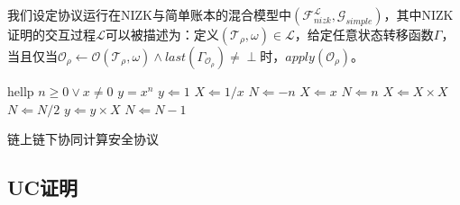 我们设定协议运行在NIZK与简单账本的混合模型中$(\mathcal{F}_{nizk}^\mathcal{L}, \mathcal{G}_{simple})$，其中NIZK证明的交互过程$\mathcal{L}$可以被描述为：定义$(\mathcal{T}_\rho, \omega) \in \mathcal{L}$，给定任意状态转移函数$\Gamma$，当且仅当$\mathcal{O}_\rho \leftarrow \mathcal{O}(\mathcal{T}_\rho, \omega)\wedge last(\Gamma_{\mathcal{O}_\rho}) \neq \perp$时，$apply(\mathcal{O}_\rho)$。

\begin{algorithm}[H]
    \begin{algorithmic} 
        \STATE hellp
        \REQUIRE $n \geq 0 \vee x \neq 0$
        \ENSURE $y = x^n$
        \STATE $y \Leftarrow 1$
            \STATE $X \Leftarrow 1 / x$
            \STATE $N \Leftarrow -n$
        \ELSE
            \STATE $X \Leftarrow x$
            \STATE $N \Leftarrow n$
        \ENDIF
                \STATE $X \Leftarrow X \times X$
                \STATE $N \Leftarrow N / 2$
            \ELSE[$N$ is odd]
                \STATE $y \Leftarrow y \times X$
                \STATE $N \Leftarrow N - 1$
            \ENDIF
        \ENDWHILE
    \end{algorithmic}
    \caption{\label{alg:function}链上链下协同计算安全协议}
\end{algorithm}

\subsection{UC证明}
